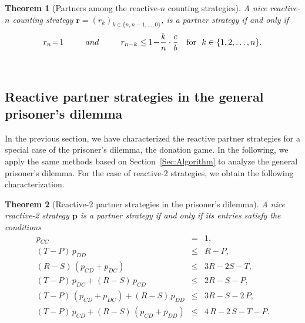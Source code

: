 \documentclass[11pt]{article}
\theoremstyle{plainCl1}
\newtheorem{theorem}{Theorem}
\theoremstyle{plainCl2}
\begin{document}
\begin{theorem}[Partners among the reactive-$n$ counting strategies]\label{theorem:reactive_counting_partner_strategies}
A nice reactive-$n$ counting strategy $\mathbf{r}\!=\!(r_k)_{k \in \{n, n-1, \dots, 0\}}$,
is a partner strategy if and only if
\begin{equation} \label{Eq:PartnerCounting}
  r_n \!=\! 1 \qquad ~~and~~ \qquad r_{n - k} \le 1 \!-\! \frac{k}{n} \cdot \frac{c}{b} ~~~\text{\normalfont for }~ k \in \{1, 2, \dots, n\}.
\end{equation}
\end{theorem}
~


\subsection{Reactive partner strategies in the general prisoner's dilemma}\label{section:general_prisoners_dilemma}

In the previous section, we have characterized the reactive partner strategies for a special case of the prisoner's dilemma, the donation game. 
In the following, we apply the same methods based on Section~\ref{Sec:Algorithm} to analyze the general prisoner's dilemma. 
For  the case of reactive-2 strategies, we obtain the following characterization. 


\begin{theorem}[Reactive-2 partner strategies in the prisoner's dilemma]
\label{theorem:reactive_two_partner_strategies_PD}
A nice reactive-2 strategy $\mathbf{p}$ is a partner strategy if and only if its entries satisfy the conditions
\begin{equation}
  \begin{array}{rcl}
    p_{CC} & = & 1, \\
    (T - P)\, p_{DD} & \le & R - P, \\ 
    (R - S)\, (p_{CD} + p_{DC}) & \le & 3 R - 2 S - T, \\
    (T - P)\, p_{DC}  + (R - S)\, p_{CD} & \le & 2 R - S - P, \\ 
    (T - P)\, (p_{CD} + p_{DC}) + (R - S)\, p_{DD}  & \le & 3 R - S - 2\,P, \\
    (T - P)\, p_{CD}  + (R - S)\, (p_{CD} + p_{DD}) & \le & 4\,R - 2\,S  - T- P.
\end{array}
\end{equation}
\end{theorem}
\end{document}
